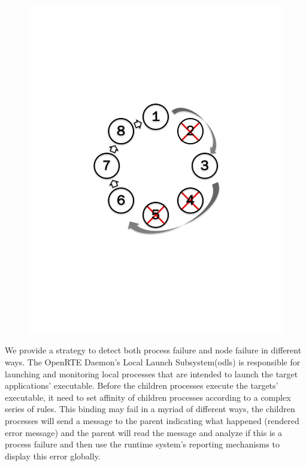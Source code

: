 \documentclass[sigconf]{acmart}
\begin{document}
\begin{figure}
\begin{minipage}{.23\textwidth}
  \includegraphics[trim=3cm 8.0cm 3cm 8cm,width=\linewidth]{reconnet_cross.pdf}
  \label{fig:Reconnect Ring}
\end{minipage}
\end{figure}
We provide a strategy to detect both process failure and node failure in different ways. The OpenRTE Daemon's Local Launch Subsystem(odls) is responsible for launching and monitoring local processes that are intended to launch the target applications' executable. Before the children processes execute the targets' executable, it need to set affinity of children processes according to a complex series of rules. This binding may fail in a myriad of different ways, the children processes will send a message to the parent indicating what happened (rendered error message) and the parent will read the message and analyze if this is a process failure and then use the runtime system's reporting mechanisms to display this error globally. 
\end{document}
